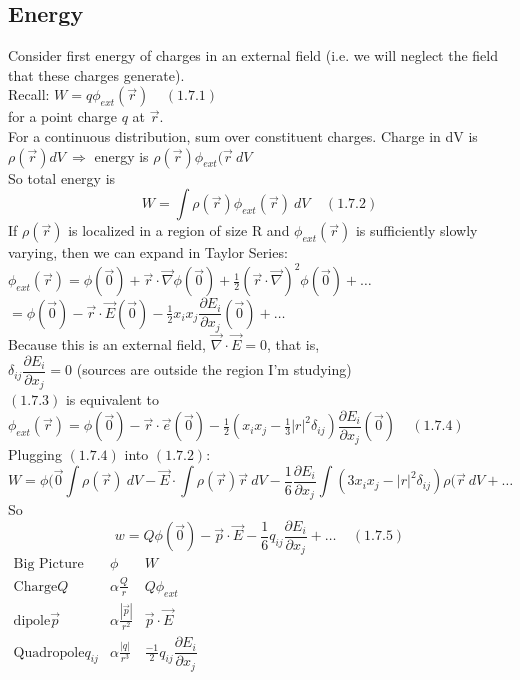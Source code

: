\documentclass[a4paper,11pt]{article}
\newcommand{\pd}[2]{\dfrac{\partial #1}{\partial #2}}
\begin{document}
\subsection{Energy}

Consider first energy of charges in an external field (i.e. we will neglect the field that these charges generate).\\
Recall: $W=q\phi_{ext}(\vec{r})~~~~~(1.7.1)$\\
for a point charge $q$ at $\vec{r}$.\\
For a continuous distribution, sum over constituent charges. Charge in dV is $\rho(\vec{r})dV~\Rightarrow$ energy is $\rho(\vec{r})\phi_{ext}(\vec{r}~dV$\\
So total energy is
$$W=\int \rho(\vec{r})\phi_{ext}(\vec{r})~dV~~~~~(1.7.2)$$
If $\rho(\vec{r})$ is localized in a region of size R and $\phi_{ext}(\vec{r})$ is sufficiently slowly varying, then we can expand in Taylor Series:\\
$\phi_{ext}(\vec{r})=\phi(\vec{0})+\vec{r}\cdot \vec{\nabla}\phi(\vec{0})+\frac{1}{2}(\vec{r}\cdot \vec{\nabla})^2 \phi(\vec{0})+\ldots$\\
$=\phi(\vec{0})-\vec{r}\cdot \vec{E}(\vec{0})-\frac{1}{2}x_ix_j\pd{E_i}{x_j}(\vec{0})+\ldots$\\
Because this is an external field, $\vec{\nabla}\cdot\vec{E}=0$, that is,\\
$\delta_{ij}\pd{E_i}{x_j}=0$ (sources are outside the region I'm studying)\\
$(1.7.3)$ is equivalent to $\phi_{ext}(\vec{r})=\phi(\vec{0})-\vec{r}\cdot\vec{e}(\vec{0})-\frac{1}{2}(x_ix_j - \frac{1}{3}|r|^2\delta_{ij})\pd{E_i}{x_j}(\vec{0})~~~~~(1.7.4)$\\
Plugging $(1.7.4)$ into $(1.7.2)$:
$$W=\phi(\vec{0}\int\rho(\vec{r})~dV-\vec{E}\cdot \int\rho(\vec{r})\vec{r}~dV-\frac{1}{6}\pd{E_i}{x_j}\int(3x_ix_j-|r|^2\delta_{ij})\rho(\vec{r}~dV+\ldots$$
So
$$w=Q\phi(\vec{0})-\vec{p}\cdot\vec{E}-\frac{1}{6}q_{ij}\pd{E_i}{x_j}+\ldots~~~~~(1.7.5)$$
$\begin{array}{ccc}\text{Big Picture}&\phi&W\\\text{Charge} Q&\alpha\frac{Q}{r}&Q\phi_{ext}\\\text{dipole}\vec{p}&\alpha\frac{|\vec{p}|}{r^2}&\vec{p}\cdot{\vec{E}}\\\text{Quadropole} q_{ij}&\alpha \frac{|q|}{r^3}&\frac{-1}{2}q_{ij}\pd{E_i}{x_j}\\ \end{array}$\\
\end{document}
